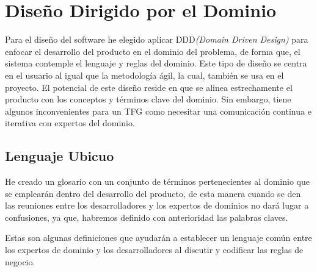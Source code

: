 \chapter{Diseño Dirigido por el Dominio}

Para el diseño del software he elegido aplicar DDD\textit{(Domain Driven Design)} para enfocar el
desarrollo del producto en el dominio del problema, de forma que, el sistema contemple el lenguaje y reglas
del dominio. Este tipo de diseño se centra en el usuario al igual que la metodología ágil, la cual,
también se usa en el proyecto. El potencial de este diseño reside en que se alinea estrechamente el producto
con los conceptos y términos clave del dominio. Sin embargo, tiene algunos inconvenientes para un TFG como
necesitar una comunicación continua e iterativa con expertos del dominio.

\section{Lenguaje Ubicuo}
He creado un glosario con un conjunto de términos pertenecientes al dominio que se emplearán dentro del desarrollo del producto,
de esta manera cuando se den las reuniones entre los desarrolladores y los expertos de dominios no dará lugar a confusiones,
ya que, habremos definido con anterioridad las palabras claves.

Estas son algunas definiciones que ayudarán a establecer un lenguaje común entre los expertos de dominio y los
desarrolladores al discutir y codificar las reglas de negocio.

